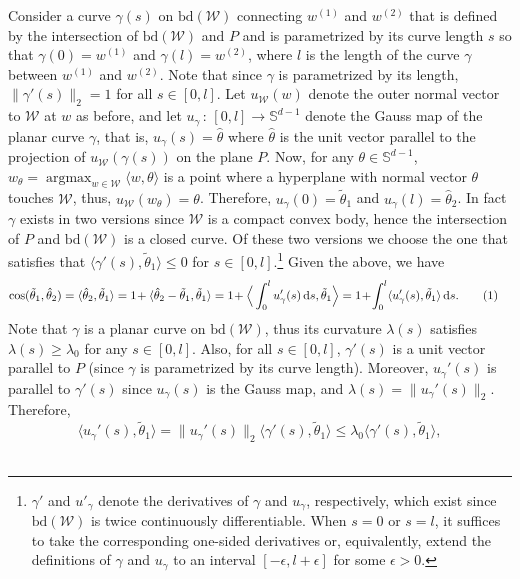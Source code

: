 \documentclass[english]{article}
\newcommand{\cW}{\mathcal{W}}
\newcommand{\bS}{\mathbb{S}}
\newcommand{\inpro}[2]{\langle #1, #2\rangle}
\newcommand{\ip}[1]{\langle#1\rangle}
\newcommand{\ttheta}{\tilde{\theta}}
\newcommand{\htheta}{\hat{\theta}}
\newcommand{\bd}{\mathrm{bd}}
\newcommand{\inangle}[2]{(#1,#2)}
\newcommand\numberthis{\addtocounter{equation}{1}\tag{\theequation}}
\DeclareMathOperator*{\argmax}{argmax}
\newenvironment{proofof}[1]{\par\noindent{\bf Proof of #1\ }}{\hfill\BlackBox\\[2mm]}
\begin{document}
\begin{proofof}{\cref{thm:R_curvesurface}}
Consider a curve $\gamma(s)$ on $\bd(\cW)$ connecting $w^{(1)}$ and $w^{(2)}$ that is defined by the intersection of $\bd(\cW)$ and $P$ and is parametrized by its curve length $s$ so that $\gamma(0) = w^{(1)}$ and $\gamma(l) = w^{(2)}$, where $l$ is the length of the curve $\gamma$ between $w^{(1)}$ and $w^{(2)}$.
Note that since $\gamma$ is parametrized by its length, $\|\gamma'(s)\|_2 = 1$ for all $s \in [0,l]$. 
Let $u_{\cW}(w)$ denote the outer normal vector to $\cW$ at $w$ as before,
and let $u_\gamma\, : \, [0,l]\rightarrow \bS^{d-1}$ denote the Gauss map of the planar curve $\gamma$, that is, $u_\gamma(s) = \htheta$ where $\htheta$ is the unit vector parallel to the projection of $u_{\cW}(\gamma(s))$ on the plane $P$. 
Now, for any $\theta \in \bS^{d-1}$, $w_\theta=\argmax_{w \in \cW} \inpro{w}{\theta}$ is a point where a hyperplane with normal vector $\theta$ touches $\cW$, thus, $u_{\cW}(w_\theta)=\theta$.
Therefore, $u_\gamma(0) = \ttheta_1$ and $u_\gamma(l) = \htheta_2$.
In fact $\gamma$ exists in two versions since $\cW$ is a compact convex body,
hence the intersection of $P$ and $\bd(\cW)$ is a closed curve.
Of these two versions we choose the one that satisfies that $\ip{\gamma'(s),\ttheta_1}\le 0$ for $s\in [0,l]$.\footnote{$\gamma'$ and $u'_\gamma$ denote the derivatives of $\gamma$ and $u_\gamma$, respectively, which exist since $\bd(\cW)$ is twice continuously differentiable. When $s=0$ or $s=l$, it suffices to take the corresponding one-sided derivatives or, equivalently, extend the definitions of $\gamma$ and $u_\gamma$ to an interval $[-\epsilon,l+\epsilon]$ for some $\epsilon>0$.}
Given the above, we have
\begin{align*}
\cos \inangle{\ttheta_1}{\htheta_2} & = \inpro{\htheta_2}{\ttheta_1} 
	 = 1 \! + \inpro{\htheta_2 - \ttheta_1}{\ttheta_1} 
	  = 1\!+ \Big\langle\int_{0}^{l} u_\gamma'(s)\,\text{d}s, \ttheta_1 \Big\rangle
	 = 1\!+ \!\int_{0}^{l} \inpro{u_\gamma'(s)}{\ttheta_1} \,\text{d}s. \numberthis \label{eq:cosint}
\end{align*}
Note that $\gamma$ is a planar curve on $\bd(\cW)$, 
thus its curvature $\lambda(s)$ satisfies $\lambda(s) \ge \lambda_0$ for any $s\in [0,l]$.
Also, for all $s \in [0,l]$, $\gamma'(s)$ is a unit vector parallel to $P$ (since $\gamma$ is parametrized by its curve length). 
Moreover, $u_\gamma'(s)$ is parallel to $\gamma'(s)$ since $u_{\gamma}(s)$ is the Gauss map, and $\lambda(s) = \|u_\gamma'(s)\|_2$.
Therefore, 
\[
\inpro{u_\gamma'(s)}{\ttheta_1} = \|u_\gamma'(s)\|_2\inpro{\gamma'(s)}{\ttheta_1} \le \lambda_0\inpro{\gamma'(s)}{\ttheta_1},
\]
\end{proofof}
\end{document}

